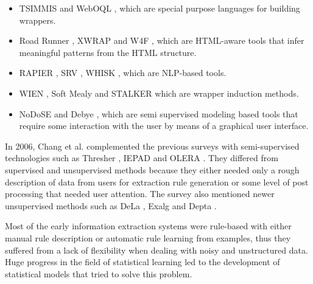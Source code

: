 \documentclass{nle}
\begin{document}
\begin{itemize}
\item TSIMMIS \cite{Hammer1997} and WebOQL \cite{Arocena1999}, which are special purpose 
languages for building wrappers.

\item Road Runner \cite{Crescenzi2001}, XWRAP \cite{Liu2000} and W4F \cite{Sahuguet1999}, 
which are HTML-aware tools that infer meaningful patterns from the HTML structure.

\item RAPIER \cite{Califf1999}, SRV \cite{Freitag1998}, WHISK \cite{Soderland1999}, which 
are NLP-based tools.

\item WIEN \cite{Kushmerick2000}, Soft Mealy \cite{Hsu1998} and STALKER \cite{Muslea1999} which 
are wrapper induction methods.

\item NoDoSE \cite{Adelberg1998} and Debye \cite{Laender2002a}, which are semi supervised modeling
based tools that require some interaction with the user by means of a graphical
user interface.
\end{itemize}

In 2006, Chang et al.  complemented the previous surveys with semi-supervised 
technologies such as Thresher \cite{Hogue2005}, IEPAD \cite{Chang2001} and 
OLERA \cite{Chang2004}. They differed from supervised 
and unsupervised methods because they either needed only a rough description of
data from users for extraction rule generation or some level of post processing
that needed user attention. The survey also mentioned newer unsupervised methods
such as DeLa \cite{Wang2003}, Exalg \cite{Arasu2003} and Depta \cite{Zhai2005}.

Most of the early information extraction systems were rule-based with either 
manual rule description or automatic rule learning from examples, thus they
suffered from a lack of flexibility when dealing with noisy and unstructured data.
Huge progress in the field of statistical learning led to the development of
statistical models that tried to solve this problem.
\end{document}
